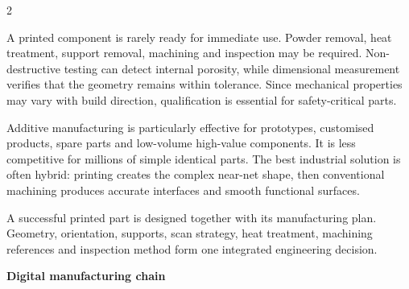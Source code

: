 \begin{multicols}{2}
\begin{ecarticle}
A printed component is rarely ready for immediate use. Powder removal, heat treatment, support
removal, machining and inspection may be required. Non-destructive testing can detect internal
porosity, while dimensional measurement verifies that the geometry remains within tolerance. Since
mechanical properties may vary with build direction, qualification is essential for safety-critical
parts.

Additive manufacturing is particularly effective for prototypes, customised products, spare parts
and low-volume high-value components. It is less competitive for millions of simple identical parts.
The best industrial solution is often hybrid: printing creates the complex near-net shape, then
conventional machining produces accurate interfaces and smooth functional surfaces.
\end{ecarticle}

\begin{tcolorbox}[title=\sffamily\bfseries Engineering Insight,colback=yellow!10,colframe=ECOrange]
A successful printed part is designed together with its manufacturing plan. Geometry, orientation,
supports, scan strategy, heat treatment, machining references and inspection method form one
integrated engineering decision.
\end{tcolorbox}

\begin{engineeringfocus}
\textbf{Digital manufacturing chain}

\begin{center}
\end{center}


\end{engineeringfocus}
\end{multicols}
